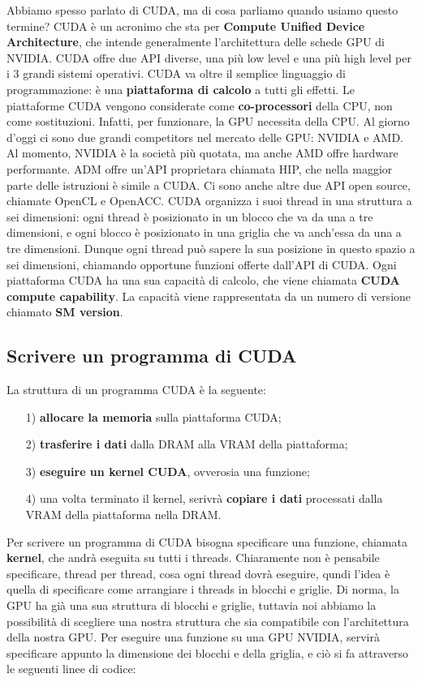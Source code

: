 Abbiamo spesso parlato di CUDA, ma di cosa parliamo quando usiamo questo termine? CUDA è un acronimo che sta per \textbf{Compute Unified Device Architecture}, che intende generalmente l'architettura delle schede GPU di NVIDIA. CUDA offre due API diverse, una più low level e una più high level per i 3 grandi sistemi operativi.
\nl
CUDA va oltre il semplice linguaggio di programmazione: è una \textbf{piattaforma di calcolo} a tutti gli effetti. Le piattaforme CUDA vengono considerate come \textbf{co-processori} della CPU, non come sostituzioni. Infatti, per funzionare, la GPU necessita della CPU.
\nl
Al giorno d'oggi ci sono due grandi competitors nel mercato delle GPU: NVIDIA e AMD. Al momento, NVIDIA è la società più quotata, ma anche AMD offre hardware performante. ADM offre un'API proprietara chiamata HIP, che nella maggior parte delle istruzioni è simile a CUDA. Ci sono anche altre due API open source, chiamate OpenCL e OpenACC.
\nl
CUDA organizza i suoi thread in una struttura a sei dimensioni: ogni thread è posizionato in un blocco che va da una a tre dimensioni, e ogni blocco è posizionato in una griglia che va anch'essa da una a tre dimensioni. Dunque ogni thread può sapere la sua posizione in questo spazio a sei dimensioni, chiamando opportune funzioni offerte dall'API di CUDA.
\nl
Ogni piattaforma CUDA ha una sua capacità di calcolo, che viene chiamata \textbf{CUDA compute capability}. La capacità viene rappresentata da un numero di versione chiamato \textbf{SM version}.

\subsection{Scrivere un programma di CUDA}

La struttura di un programma CUDA è la seguente:
\begin{itemize}
    \item [1)] \textbf{allocare la memoria} sulla piattaforma CUDA;
    \item [2)] \textbf{trasferire i dati} dalla DRAM alla VRAM della piattaforma;
    \item [3)] \textbf{eseguire un kernel CUDA}, ovverosia una funzione;
    \item [4)] una volta terminato il kernel, serivrà \textbf{copiare i dati} processati dalla VRAM della piattaforma nella DRAM.
\end{itemize}

Per scrivere un programma di CUDA bisogna specificare una funzione, chiamata \textbf{kernel}, che andrà eseguita su tutti i threads. Chiaramente non è pensabile specificare, thread per thread, cosa ogni thread dovrà eseguire, qundi l'idea è quella di specificare come arrangiare i threads in blocchi e griglie. Di norma, la GPU ha già una sua struttura di blocchi e griglie, tuttavia noi abbiamo la possibilità di scegliere una nostra struttura che sia compatibile con l'architettura della nostra GPU.
\nl
Per eseguire una funzione su una GPU NVIDIA, servirà specificare appunto la dimensione dei blocchi e della griglia, e ciò si fa attraverso le seguenti linee di codice:

